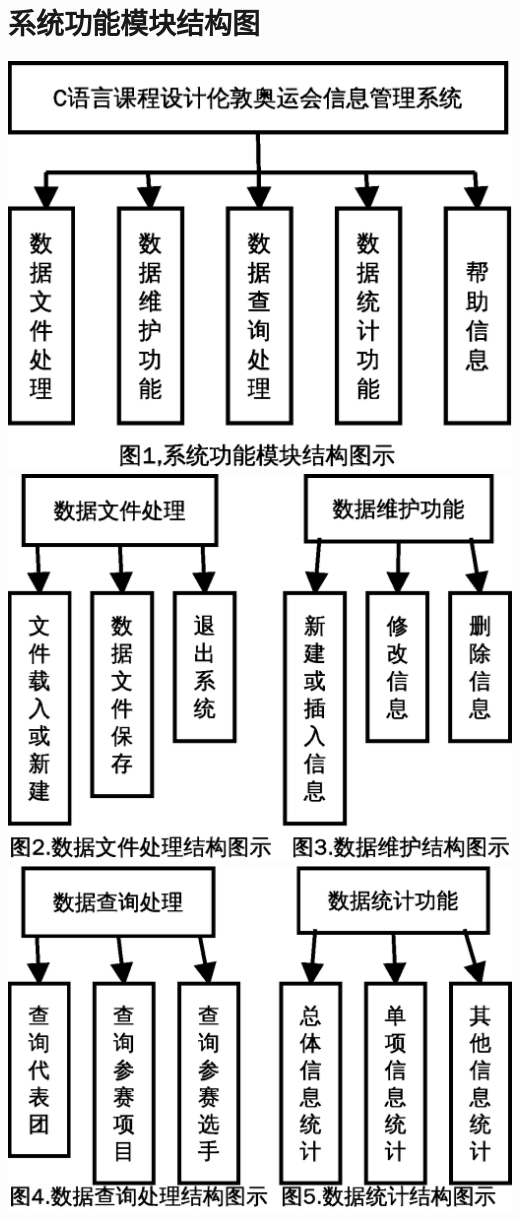 \documentclass[10pt,a4paper]{article}
\begin{document}
\section{系统功能模块结构图}
\includegraphics[scale=0.8]{1}
\newline
\newline
\includegraphics[scale=0.7]{2}
\newline
\newline
\includegraphics[scale=0.7]{3}
\end{document}
